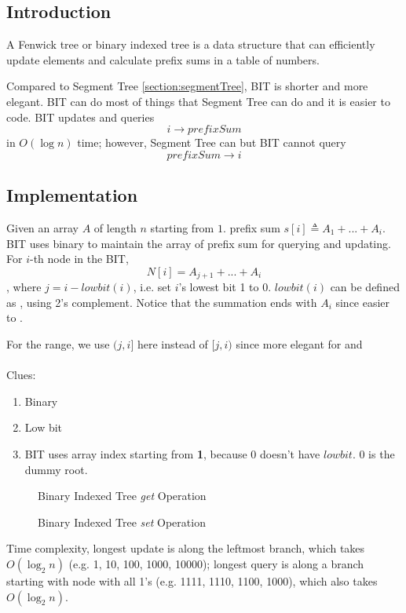 \subsection{Introduction}
A Fenwick tree or binary indexed tree is a data structure that can efficiently update elements and calculate prefix sums in a table of numbers.

Compared to Segment Tree \ref{section:segmentTree}, BIT is shorter and more elegant. BIT can do most of things that Segment Tree can do and it is easier to code. BIT updates and queries $$i\rightarrow prefixSum$$ in $O(\log n)$ time; however, Segment Tree can but BIT cannot query $$prefixSum \rightarrow i$$
\subsection{Implementation}
Given an array $A$ of length $n $ starting from $1$. prefix sum $s[i]\triangleq A_1+...+A_i$. BIT uses binary to maintain the array of prefix sum for querying and updating. For $i$-th node in the BIT, 
$$
N[i]=A_{j+1}+...+A_i
$$
, where $j=i-lowbit(i)$, i.e. set $i$'s lowest bit 1 to 0. $lowbit(i)$ can be defined as , using 2's complement. Notice that the summation ends with $A_i$ since easier to .

For the range, we use $(j, i]$ here instead of $[j, i)$ since more elegant for  and 
\\\\
Clues:
\begin{enumerate}
\item Binary 
\item Low bit
\item BIT uses array index starting from \textbf{1}, because 0 doesn't have $lowbit$. 0 is the dummy root.
\end{enumerate}
\begin{figure}[hbtp]
\centering
{}
\caption{Binary Indexed Tree \textit{get} Operation}
\label{fig:LABEL}
\end{figure}

\begin{figure}[hbtp]
\centering
{}
\caption{Binary Indexed Tree \textit{set} Operation}
\label{fig:LABEL}
\end{figure}

Time complexity, longest update is along the leftmost branch, which takes $O(\log_2 n)$ (e.g. 1, 10, 100, 1000, 10000); longest query is along a branch starting with node with all 1's (e.g. 1111, 1110, 1100, 1000), which also takes $O(\log_2 n)$.

